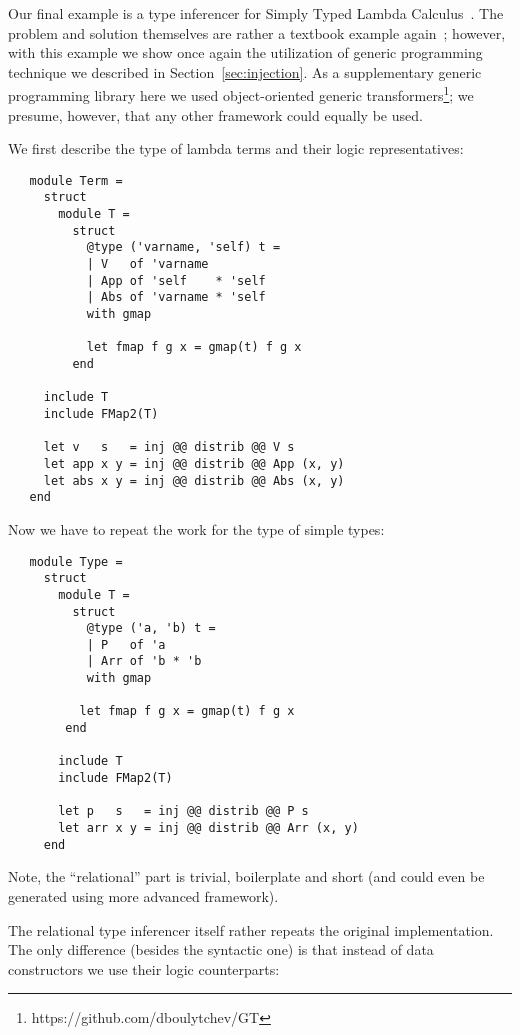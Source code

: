 Our final example is a type inferencer for Simply Typed Lambda Calculus~\cite{Lambda}. The problem and 
solution themselves are rather a textbook example again~\cite{TRS, WillThesis}; however, with this example
we show once again the utilization of generic programming technique we described in Section~\ref{sec:injection}.
As a supplementary generic programming library here we used object-oriented generic transformers\footnote{https://github.com/dboulytchev/GT}; 
we presume, however, that any other framework could equally be used.

We first describe the type of lambda terms and their logic representatives:

\begin{lstlisting}
   module Term = 
     struct
       module T = 
         struct
           @type ('varname, 'self) t =
           | V   of 'varname
           | App of 'self    * 'self
           | Abs of 'varname * 'self
           with gmap

           let fmap f g x = gmap(t) f g x
         end

     include T
     include FMap2(T)

     let v   s   = inj @@ distrib @@ V s
     let app x y = inj @@ distrib @@ App (x, y)
     let abs x y = inj @@ distrib @@ Abs (x, y)
   end
\end{lstlisting}

Now we have to repeat the work for the type of simple types:

\begin{lstlisting}
   module Type = 
     struct
       module T = 
         struct    
           @type ('a, 'b) t = 
           | P   of 'a    
           | Arr of 'b * 'b 
           with gmap

          let fmap f g x = gmap(t) f g x
        end

       include T
       include FMap2(T)

       let p   s   = inj @@ distrib @@ P s
       let arr x y = inj @@ distrib @@ Arr (x, y)
     end
\end{lstlisting}

Note, the ``relational'' part is trivial, boilerplate and short (and could even be generated 
using more advanced framework).

The relational type inferencer itself rather repeats the original implementation. The only
difference (besides the syntactic one) is that instead of data constructors we use their logic 
counterparts:


